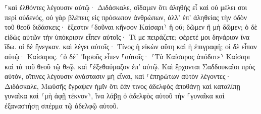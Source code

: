 \documentclass{openreader}
\begin{document}
⸀καὶ ἐλθόντες λέγουσιν αὐτῷ· Διδάσκαλε, οἴδαμεν ὅτι ἀληθὴς εἶ καὶ οὐ μέλει σοι περὶ οὐδενός, οὐ γὰρ βλέπεις εἰς πρόσωπον ἀνθρώπων, ἀλλ’ ἐπ’ ἀληθείας τὴν ὁδὸν τοῦ θεοῦ διδάσκεις· ἔξεστιν ⸂δοῦναι κῆνσον Καίσαρι⸃ ἢ οὔ; δῶμεν ἢ μὴ δῶμεν; 
ὁ δὲ εἰδὼς αὐτῶν τὴν ὑπόκρισιν εἶπεν αὐτοῖς· Τί με πειράζετε; φέρετέ μοι δηνάριον ἵνα ἴδω. 
οἱ δὲ ἤνεγκαν. καὶ λέγει αὐτοῖς· Τίνος ἡ εἰκὼν αὕτη καὶ ἡ ἐπιγραφή; οἱ δὲ εἶπαν αὐτῷ· Καίσαρος. 
⸂ὁ δὲ⸃ Ἰησοῦς εἶπεν ⸀αὐτοῖς· ⸂Τὰ Καίσαρος ἀπόδοτε⸃ Καίσαρι καὶ τὰ τοῦ θεοῦ τῷ θεῷ. καὶ ⸀ἐξεθαύμαζον ἐπ’ αὐτῷ. 
Καὶ ἔρχονται Σαδδουκαῖοι πρὸς αὐτόν, οἵτινες λέγουσιν ἀνάστασιν μὴ εἶναι, καὶ ⸀ἐπηρώτων αὐτὸν λέγοντες· 
Διδάσκαλε, Μωϋσῆς ἔγραψεν ἡμῖν ὅτι ἐάν τινος ἀδελφὸς ἀποθάνῃ καὶ καταλίπῃ γυναῖκα καὶ ⸂μὴ ἀφῇ τέκνον⸃, ἵνα λάβῃ ὁ ἀδελφὸς αὐτοῦ τὴν ⸀γυναῖκα καὶ ἐξαναστήσῃ σπέρμα τῷ ἀδελφῷ αὐτοῦ. 
\end{document}
